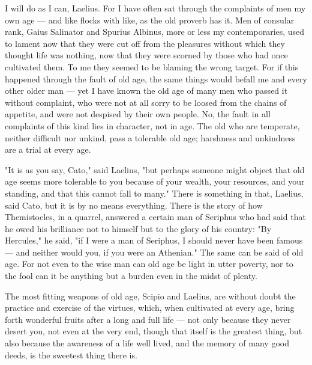  I will do as I can, Laelius. For I have often sat through the complaints of men my own age — and like flocks with like, as the old proverb has it. Men of consular rank, Gaius Salinator and Spurius Albinus, more or less my contemporaries, used to lament now that they were cut off from the pleasures without which they thought life was nothing, now that they were scorned by those who had once cultivated them. To me they seemed to be blaming the wrong target. For if this happened through the fault of old age, the same things would befall me and every other older man — yet I have known the old age of many men who passed it without complaint, who were not at all sorry to be loosed from the chains of appetite, and were not despised by their own people. No, the fault in all complaints of this kind lies in character, not in age. The old who are temperate, neither difficult nor unkind, pass a tolerable old age; harshness and unkindness are a trial at every age.

 "It is as you say, Cato," said Laelius, "but perhaps someone might object that old age seems more tolerable to you because of your wealth, your resources, and your standing, and that this cannot fall to many." There is something in that, Laelius, said Cato, but it is by no means everything. There is the story of how Themistocles, in a quarrel, answered a certain man of Seriphus who had said that he owed his brilliance not to himself but to the glory of his country: "By Hercules," he said, "if I were a man of Seriphus, I should never have been famous — and neither would you, if you were an Athenian." The same can be said of old age. For not even to the wise man can old age be light in utter poverty, nor to the fool can it be anything but a burden even in the midst of plenty.

 The most fitting weapons of old age, Scipio and Laelius, are without doubt the practice and exercise of the virtues, which, when cultivated at every age, bring forth wonderful fruits after a long and full life — not only because they never desert you, not even at the very end, though that itself is the greatest thing, but also because the awareness of a life well lived, and the memory of many good deeds, is the sweetest thing there is.

